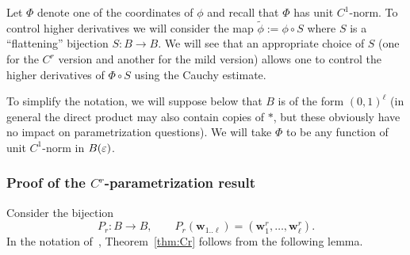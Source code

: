 \documentclass[reqno]{amsart}
\renewcommand\~[1]{\widetilde{#1}}
\def\vw{{\mathbf w}}
\begin{document}
Let $\Phi$ denote one of the coordinates of $\phi$ and recall that
$\Phi$ has unit $C^1$-norm. To control higher derivatives we will
consider the map $\tilde\phi:=\phi\circ S$ where $S$ is a
``flattening'' bijection $S:B\to B$. We will see that an appropriate
choice of $S$ (one for the $C^r$ version and another for the mild
version) allows one to control the higher derivatives of $\Phi\circ S$
using the Cauchy estimate.

To simplify the notation, we will suppose below that $B$ is of the
form $(0,1)^\ell$ (in general the direct product may also contain
copies of $*$, but these obviously have no impact on parametrization
questions). We will take $\Phi$ to be any function of unit $C^1$-norm
in $B(\varepsilon)$.

\subsubsection{Proof of the $C^r$-parametrization result}
\label{sec:params-proofs-cR}

Consider the bijection
\begin{equation}
P_r:B\to B, \qquad P_r(\vw_{1..\ell})=(\vw_1^r,\ldots,\vw_\ell^r).
\end{equation}
In the notation of~, Theorem~\ref{thm:Cr}
follows from the following lemma.
\end{document}
